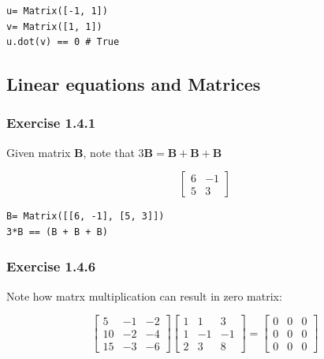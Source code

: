 \documentclass[a4paper]{article}
\begin{document}
\begin{verbatim}
u= Matrix([-1, 1])
v= Matrix([1, 1])
u.dot(v) == 0 # True
\end{verbatim}

\subsection{Linear equations and Matrices}

\subsubsection{Exercise 1.4.1}

Given matrix \textbf{B}, note that $3\mathbf{B} = \mathbf{B} + \mathbf{B} + \mathbf{B}$

\begin{equation}
\left[\begin{matrix}6 & -1\\5 & 3\end{matrix}\right]
\end{equation}

\begin{verbatim}
B= Matrix([[6, -1], [5, 3]])
3*B == (B + B + B)
\end{verbatim}

\subsubsection{Exercise 1.4.6}

Note how matrx multiplication can result in zero matrix:

\begin{equation}
\left[\begin{matrix}5 & -1 & -2\\10 & -2 & -4\\15 & -3 & -6\end{matrix}\right]
\left[\begin{matrix}1 & 1 & 3\\1 & -1 & -1\\2 & 3 & 8\end{matrix}\right]
= \left[\begin{matrix}0 & 0 & 0\\0 & 0 & 0\\0 & 0 & 0\end{matrix}\right]
\end{equation}
\end{document}
